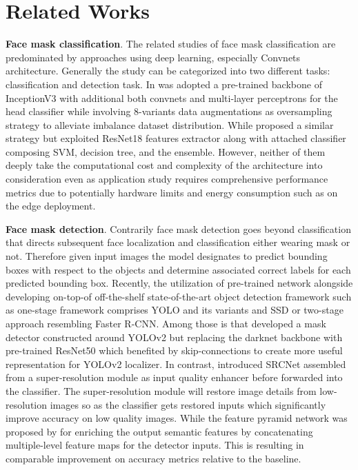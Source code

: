\documentclass[conference]{IEEEtran}
\begin{document}
 


\section{Related Works}
\textbf{Face mask classification}. The related studies of face mask classification are predominated by approaches using deep learning, especially Convnets architecture. Generally the study can be categorized into two different tasks: classification \cite{Loey2020AHD, Chowdary2020FaceMD, Sanjaya2020} and  detection task\cite{Jiang2020, Qin2020, Loey2020FightingAC, Chavda2020, Suresh2021, Roy2020}. In \cite{Chowdary2020FaceMD} was adopted a pre-trained backbone of InceptionV3 with additional both convnets  and multi-layer perceptrons for the head classifier while involving 8-variants data augmentations as oversampling strategy to alleviate imbalance dataset distribution. While \cite{Loey2020AHD} proposed a similar strategy but exploited ResNet18 features extractor along with attached classifier composing SVM, decision tree, and the ensemble. However, neither of them deeply take the computational cost and complexity of the architecture into consideration even as application study requires comprehensive performance metrics due to potentially hardware limits and energy consumption such as on the edge deployment. 

\textbf{Face mask detection}. Contrarily face mask detection goes beyond classification that directs subsequent face localization and classification either wearing mask or not. Therefore given input images the model designates to predict bounding boxes with respect to the objects and determine associated correct labels for each predicted bounding box. Recently, the utilization of pre-trained network alongside developing on-top-of off-the-shelf state-of-the-art object detection framework such as  one-stage framework comprises YOLO\cite{Redmon2016YouOL} and its variants \cite{Redmon2018YOLOv3AI} and SSD\cite{Liu2016SSDSS} or two-stage approach resembling Faster R-CNN\cite{Ren2015FasterRT}. Among those is \cite{Loey2020FightingAC} that developed a mask detector constructed around YOLOv2 but replacing the darknet backbone with pre-trained ResNet50 which benefited by skip-connections to create more useful representation for YOLOv2 localizer. In contrast, \cite{Qin2020} introduced SRCNet assembled from a super-resolution module as input quality enhancer before forwarded into the classifier. The super-resolution module will restore image details from low-resolution images so as the classifier gets restored inputs which significantly improve accuracy on low quality images. While the feature pyramid network was proposed by \cite{Jiang2020} for enriching the output semantic features by concatenating multiple-level feature maps for the detector inputs. This is resulting in comparable improvement on accuracy metrics relative to the baseline.
\end{document}
